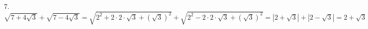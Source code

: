7. $\sqrt{7+4\sqrt{3}}+\sqrt{7-4\sqrt{3}}=\sqrt{2^2+2\cdot2\cdot\sqrt{3}+(\sqrt{3})^2}+\sqrt{2^2-2\cdot2\cdot\sqrt{3}+(\sqrt{3})^2}=
|2+\sqrt{3}|+|2-\sqrt{3}|=2+\sqrt{3}+2-\sqrt{3}=4.$\\
